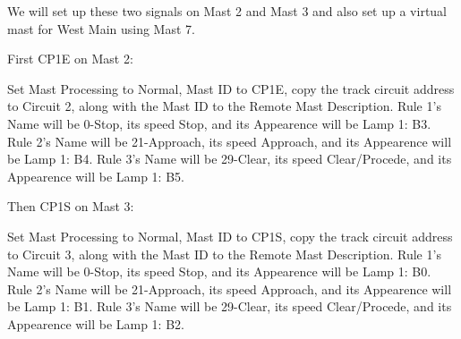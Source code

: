 We will set up these two signals on Mast 2 and Mast 3 and also set up a 
virtual mast for West Main using Mast 7.

First CP1E on Mast 2:

Set Mast Processing to Normal, Mast ID to CP1E, copy the track circuit address 
to Circuit 2, along with the Mast ID to the Remote Mast Description. Rule 1's
Name will be 0-Stop, its speed Stop, and its Appearence will be Lamp 1: B3.
Rule 2's Name will be 21-Approach, its speed Approach, and its Appearence will 
be Lamp 1: B4. Rule 3's Name will be 29-Clear, its speed Clear/Procede, and 
its Appearence will be Lamp 1: B5.

Then CP1S on Mast 3:

Set Mast Processing to Normal, Mast ID to CP1S, copy the track circuit address 
to Circuit 3, along with the Mast ID to the Remote Mast Description. Rule 1's
Name will be 0-Stop, its speed Stop, and its Appearence will be Lamp 1: B0.
Rule 2's Name will be 21-Approach, its speed Approach, and its Appearence will 
be Lamp 1: B1. Rule 3's Name will be 29-Clear, its speed Clear/Procede, and 
its Appearence will be Lamp 1: B2.






\clearpage

